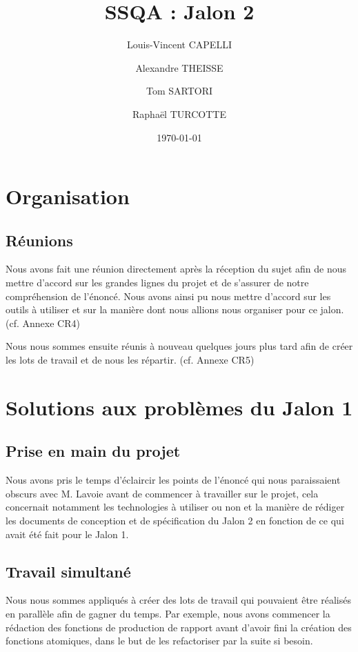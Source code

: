 \documentclass{report}
\begin{document}
\title{SSQA : Jalon 2}

\author{Louis-Vincent CAPELLI \and Alexandre THEISSE \and Tom SARTORI \and Raphaël TURCOTTE}
\date{\today}
\maketitle

\chapter{Organisation}
\section{Réunions}
Nous avons fait une réunion directement après la réception du sujet
afin de nous mettre d'accord sur les grandes lignes du projet et
de s'assurer de notre compréhension de l'énoncé. Nous avons ainsi pu
nous mettre d'accord sur les outils à utiliser et sur la manière
dont nous allions nous organiser pour ce jalon. (cf. Annexe CR4)

Nous nous sommes ensuite réunis à nouveau quelques jours plus tard
afin de créer les lots de travail et de nous les répartir. (cf. Annexe CR5)


\chapter{Solutions aux problèmes du Jalon 1}
\section{Prise en main du projet}
Nous avons pris le temps d'éclaircir les points de l'énoncé qui
nous paraissaient obscurs avec M. Lavoie avant de commencer à
travailler sur le projet, cela concernait notamment les technologies
à utiliser ou non et la manière de rédiger les documents de
conception et de spécification du Jalon 2 en fonction de ce qui
avait été fait pour le Jalon 1.

\section{Travail simultané}
Nous nous sommes appliqués à créer des lots de travail qui
pouvaient être réalisés en parallèle afin de gagner du temps.
Par exemple, nous avons commencer la rédaction des fonctions de
production de rapport avant d'avoir fini la création des fonctions
atomiques, dans le but de les refactoriser par la suite si besoin.
\end{document}
